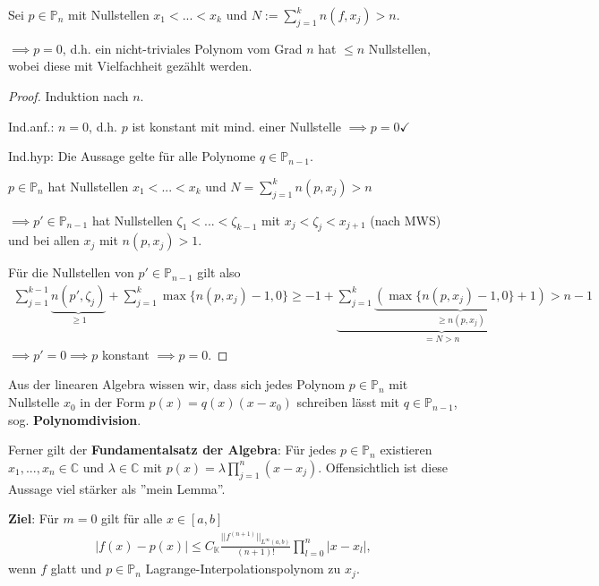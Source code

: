 \begin{lemma}
	Sei $p \in \mathbb{P}_n$ mit Nullstellen $x_1 < ... < x_k$ und $N := \sum_{j=1}^{k}n(f,x_j) > n$.
	
	$\implies p=0$, d.h. ein nicht-triviales Polynom vom Grad $n$ hat $\leq n$ Nullstellen, wobei diese mit Vielfachheit gezählt werden.
\end{lemma}

\begin{proof}
	Induktion nach $n$.
	
	Ind.anf.: $n=0$, d.h. $p$ ist konstant mit mind. einer Nullstelle $\implies p=0 \checkmark$
	
	Ind.hyp: Die Aussage gelte für alle Polynome $q \in \mathbb{P}_{n-1}$.
	
	$p \in \mathbb{P}_n$ hat Nullstellen $x_1 < ... < x_k$ und $N = \sum_{j=1}^{k}n(p, x_j) > n$
	
	$\implies p' \in \mathbb{P}_{n-1}$ hat Nullstellen $\zeta_1 < ... < \zeta_{k-1}$ mit $x_j < \zeta_j < x_{j+1}$ (nach MWS) und bei allen $x_j$ mit $n(p,x_j)>1$.
	
	Für die Nullstellen von $p'\in \mathbb{P}_{n-1}$ gilt also
	\begin{align*}
		\sum_{j=1}^{k-1} \underbrace{n(p',\zeta_j)}_{\geq 1} + \sum_{j=1}^{k} \max\{n(p,x_j)-1, 0\}
		\geq -1 + \underbrace{\sum_{j=1}^{k} \underbrace{(\max\{n(p,x_j) - 1, 0\} + 1)}_{\geq n(p,x_j)} }_{=N > n} > n-1
	\end{align*}
	$\implies p' = 0 \implies p$ konstant $\implies p=0$.
\end{proof}

\begin{remark}
	Aus der linearen Algebra wissen wir, dass sich jedes Polynom $p \in \mathbb{P}_n$ mit Nullstelle $x_0$ in der Form $p(x) = q(x)(x-x_0)$ schreiben lässt mit $q \in \mathbb{P}_{n-1}$, sog. \textbf{Polynomdivision}.
\end{remark}

Ferner gilt der \textbf{Fundamentalsatz der Algebra}: Für jedes $p \in \mathbb{P}_n$ existieren $x_1, ..., x_n \in \mathbb{C}$ und $\lambda \in \mathbb{C}$ mit $p(x) = \lambda \prod_{j=1}^{n}(x-x_j)$. Offensichtlich ist diese Aussage viel stärker als ''mein Lemma''.

\textbf{Ziel}: Für $m=0$ gilt für alle $x \in [a,b]$
\begin{align*}
	|f(x)-p(x)| \leq C_{\mathbb{K}} \frac{||f^{(n+1)}||_{L^\infty(a,b)}}{(n+1)!} \prod_{l=0}^{n} |x-x_l|,
\end{align*}
wenn $f$ glatt und $p \in \mathbb{P}_n$ Lagrange-Interpolationspolynom zu $x_j$.

